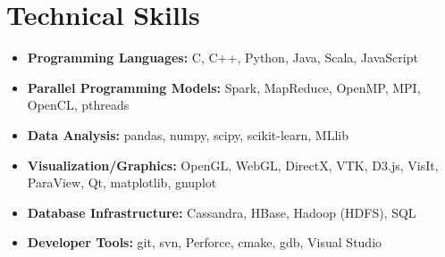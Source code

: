 \section{Technical Skills}

\begin{itemize}

\item \textbf{Programming Languages:} C, C++, Python, Java, Scala, JavaScript

\item \textbf{Parallel Programming Models:} Spark, MapReduce, OpenMP, MPI, OpenCL, pthreads

\item \textbf{Data Analysis:} pandas, numpy, scipy, scikit-learn, MLlib

\item \textbf{Visualization/Graphics:} OpenGL, WebGL, DirectX, VTK, D3.js, VisIt, ParaView, Qt, matplotlib, gnuplot

\item \textbf{Database Infrastructure:} Cassandra, HBase, Hadoop (HDFS), SQL

\item \textbf{Developer Tools:} git, svn, Perforce, cmake, gdb, Visual Studio

\end{itemize}

